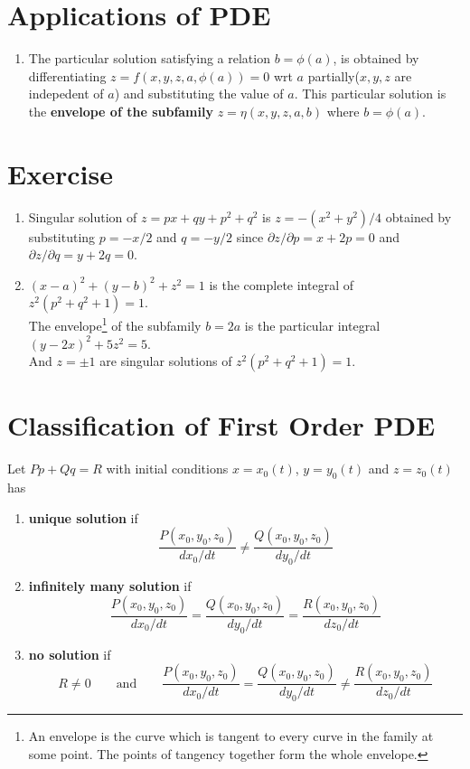 \section{Applications of PDE}
\begin{enumerate}
	\item The particular solution satisfying a relation  $b = \phi(a)$, is obtained by differentiating $z= f(x,y,z,a,\phi(a)) = 0$ wrt $a$ partially($x,y,z$ are indepedent of $a$) and substituting the value of $a$. This particular solution is the \textbf{envelope of the subfamily} $z = \eta(x,y,z,a,b)$ where $b=\phi(a)$.
\end{enumerate}
\section*{Exercise}
\begin{enumerate}
	\item Singular solution of $z = px + qy + p^2 + q^2$ is $z = -(x^2+y^2)/4$ obtained by substituting $p = -x/2$ and $q = -y/2$ since $\partial z/\partial p = x + 2p = 0$ and $\partial z/\partial q = y + 2q = 0$.
	\item $(x-a)^2 + (y-b)^2 + z^2 = 1$ is the complete integral of $z^2(p^2+q^2+1) = 1$. \\
	The envelope\footnote{An envelope is the curve which is tangent to every curve in the family at some point. The points of tangency together form the whole envelope.} of the subfamily $b = 2a$ is  the particular integral $(y-2x)^2+5z^2 = 5$.\\
	And $z = \pm 1$ are singular solutions of $z^2(p^2+q^2+1) = 1$.
\end{enumerate}

\section{Classification of First Order PDE}
Let $Pp + Qq = R$ with initial conditions $x = x_0(t)$, $y = y_0(t)$ and $z = z_0(t)$ has
\begin{enumerate}
	\item \textbf{unique solution} if $$\frac{P(x_0,y_0,z_0)}{dx_0/dt} \ne \frac{Q(x_0,y_0,z_0)}{dy_0/dt}$$
	\item \textbf{infinitely many solution} if $$\frac{P(x_0,y_0,z_0)}{dx_0/dt} = \frac{Q(x_0,y_0,z_0)}{dy_0/dt} = \frac{R(x_0,y_0,z_0)}{dz_0/dt}$$
	\item \textbf{no solution} if $$R \ne 0 \qquad \text{and}\qquad \frac{P(x_0,y_0,z_0)}{dx_0/dt} = \frac{Q(x_0,y_0,z_0)}{dy_0/dt} \ne \frac{R(x_0,y_0,z_0)}{dz_0/dt}$$
\end{enumerate}
